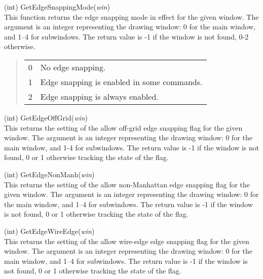 \begin{description}
\item{(int) \vt GetEdgeSnappingMode({\it win})}\\
This function returns the edge snapping mode in effect for the given
window.  The argument is an integer representing the drawing window: 
0 for the main window, and 1--4 for subwindows.  The return value is
-1 if the window is not found, 0-2 otherwise.

\begin{quote}
\begin{tabular}{ll}
0 & No edge snapping.\\
1 & Edge snapping is enabled in some commands.\\
2 & Edge snapping is always enabled.\\
\end{tabular}
\end{quote}

\item{(int) \vt GetEdgeOffGrid({\it win})}\\
This returns the setting of the allow off-grid edge snapping flag for
the given window.  The argument is an integer representing the drawing
window:  0 for the main window, and 1-4 for subwindows.  The return
value is -1 if the window is not found, 0 or 1 otherwise tracking the
state of the flag.

\item{(int) \vt GetEdgeNonManh({\it win})}\\
This returns the setting of the allow non-Manhattan edge snapping flag
for the given window.  The argument is an integer representing the
drawing window:  0 for the main window, and 1--4 for subwindows.  The
return value is -1 if the window is not found, 0 or 1 otherwise
tracking the state of the flag.

\item{(int) \vt GetEdgeWireEdge({\it win})}\\
This returns the setting of the allow wire-edge edge snapping flag for
the given window.  The argument is an integer representing the drawing
window:  0 for the main window, and 1--4 for subwindows.  The return
value is -1 if the window is not found, 0 or 1 otherwise tracking the
state of the flag.


\end{description}
